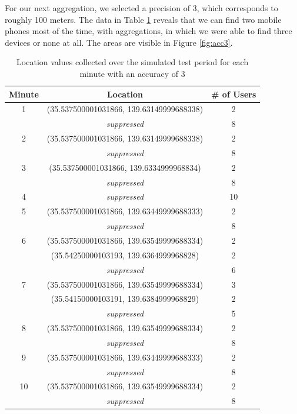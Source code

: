 For our next aggregation, we selected a precision of 3, which corresponds to roughly 100 meters. The data in Table \ref{tab:location_sim3} reveals that we can find two mobile phones most of the time, with aggregations, in which we were able to find three devices or none at all. The areas are visible in Figure \ref{fig:acc3}.

\begin{table}[htbp]
    \centering
    \begin{tabular}{|c|c|c|} 
        \hline
        \textbf{Minute} & \textbf{Location} & \textbf{\# of Users}\\ [0.5ex] 
        \hline
        1 & (35.537500001031866, 139.63149999688338) & 2 \\ 
        &\textit{suppressed} & 8 \\ 
        \hline
        2 & (35.537500001031866, 139.63149999688338) & 2 \\ 
        &\textit{suppressed} & 8 \\ 
        \hline
        3 & (35.537500001031866, 139.6334999968834) & 2 \\ 
        &\textit{suppressed} & 8 \\ 
        \hline
        4 & \textit{suppressed} & 10 \\
        \hline
        5 & (35.537500001031866, 139.63449999688333) & 2 \\ 
        &\textit{suppressed} & 8 \\ 
        \hline
        6 & (35.537500001031866, 139.63549999688334) & 2 \\ 
        & (35.54250000103193, 139.6364999968828) & 2 \\ 
        &\textit{suppressed} & 6\\
        \hline
        7 & (35.537500001031866, 139.63549999688334) & 3 \\ 
        & (35.54150000103191, 139.6384999968829) & 2 \\ 
        &\textit{suppressed} & 5\\ 
        \hline
        8 & (35.537500001031866, 139.63549999688334) & 2 \\ 
        &\textit{suppressed} & 8 \\ 
        \hline
        9 & (35.537500001031866, 139.63449999688333) & 2 \\ 
        &\textit{suppressed} & 8 \\ 
        \hline
        10 & (35.537500001031866, 139.63549999688334) & 2 \\ 
        &\textit{suppressed} & 8 \\ 
        \hline
    \end{tabular}
    \caption{Location values collected over the simulated test period for each minute with an accuracy of 3}
    \label{tab:location_sim3}
\end{table}

